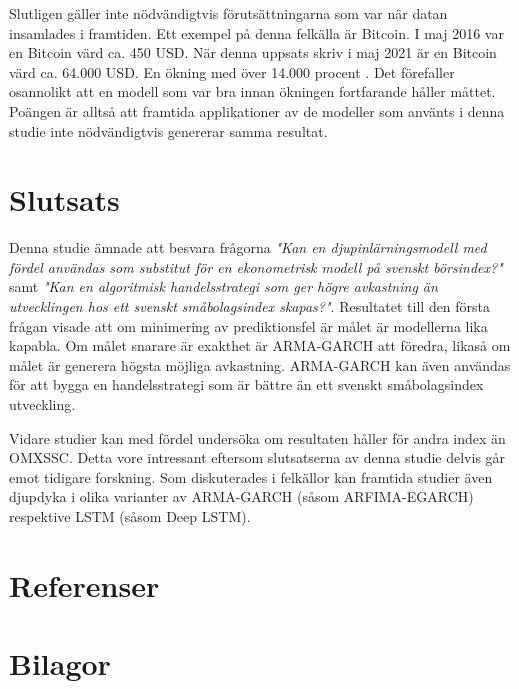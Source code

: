 \documentclass[11pt]{article}
\numberwithin{equation}{section}
\numberwithin{table}{section}
\numberwithin{figure}{section}
\begin{document}
Slutligen gäller inte nödvändigtvis förutsättningarna som var när datan insamlades i framtiden. Ett exempel på denna felkälla är Bitcoin. I maj 2016 var en Bitcoin värd ca. 450 USD. När denna uppsats skriv i maj 2021 är en Bitcoin värd ca. 64.000 USD. En ökning med över 14.000 procent \parencite{yahoo_bitcoin}. Det förefaller osannolikt att en modell som var bra innan ökningen fortfarande håller måttet. Poängen är alltså att framtida applikationer av de modeller som använts i denna studie inte nödvändigtvis genererar samma resultat.

\newpage
\section{Slutsats}
Denna studie ämnade att besvara frågorna \emph{"Kan en djupinlärningsmodell med fördel användas som substitut för en ekonometrisk modell på svenskt börsindex?"} samt \emph{"Kan en algoritmisk handelsstrategi som ger högre avkastning än utvecklingen hos ett svenskt småbolagsindex skapas?"}. Resultatet till den första frågan visade att om minimering av prediktionsfel är målet är modellerna lika kapabla. Om målet snarare är exakthet är ARMA-GARCH att föredra, likaså om målet är generera högsta möjliga avkastning. ARMA-GARCH kan även användas för att bygga en handelsstrategi som är bättre än ett svenskt småbolagsindex utveckling.

Vidare studier kan med fördel undersöka om resultaten håller för andra index än OMXSSC. Detta vore intressant eftersom slutsatserna av denna studie delvis går emot tidigare forskning. Som diskuterades i felkällor kan framtida studier även djupdyka i olika varianter av ARMA-GARCH (såsom ARFIMA-EGARCH) respektive LSTM (såsom Deep LSTM).



\newpage
\section*{Referenser}
\printbibliography[heading=none]




\newpage

\appendix
\section*{Bilagor}
\renewcommand{\thesubsection}{\Alph{subsection}}
\end{document}

